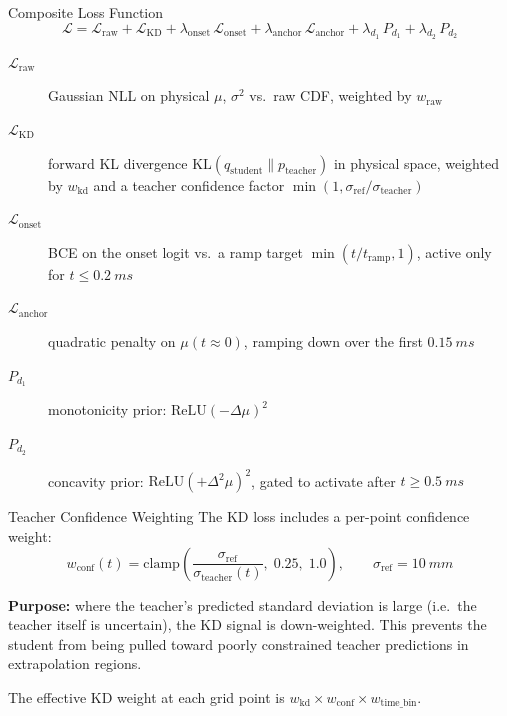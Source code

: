 \documentclass[UTF8,aspectratio=169]{ctexbeamer}
\begin{document}
\begin{frame}{Composite Loss Function}
\[
\mathcal{L} = \mathcal{L}_{\mathrm{raw}} + \mathcal{L}_{\mathrm{KD}} + \lambda_{\mathrm{onset}}\,\mathcal{L}_{\mathrm{onset}} + \lambda_{\mathrm{anchor}}\,\mathcal{L}_{\mathrm{anchor}} + \lambda_{d_1}\,P_{d_1} + \lambda_{d_2}\,P_{d_2}
\]

\vspace{0.2em}
\begin{description}
  \item[$\mathcal{L}_{\mathrm{raw}}$] Gaussian NLL on physical $\mu$, $\sigma^2$ vs.\ raw CDF, weighted by $w_{\mathrm{raw}}$
  \item[$\mathcal{L}_{\mathrm{KD}}$] forward KL divergence $\mathrm{KL}(q_{\mathrm{student}}\|p_{\mathrm{teacher}})$ in physical space, weighted by $w_{\mathrm{kd}}$ and a teacher confidence factor $\min(1, \sigma_{\mathrm{ref}}/\sigma_{\mathrm{teacher}})$
  \item[$\mathcal{L}_{\mathrm{onset}}$] BCE on the onset logit vs.\ a ramp target $\min(t/t_{\mathrm{ramp}}, 1)$, active only for $t\leq\SI{0.2}{ms}$
  \item[$\mathcal{L}_{\mathrm{anchor}}$] quadratic penalty on $\mu(t\approx0)$, ramping down over the first $\SI{0.15}{ms}$
  \item[$P_{d_1}$] monotonicity prior: $\mathrm{ReLU}(-\Delta\mu)^2$
  \item[$P_{d_2}$] concavity prior: $\mathrm{ReLU}(+\Delta^2\mu)^2$, gated to activate after $t\geq\SI{0.5}{ms}$
\end{description}
\end{frame}

\begin{frame}{Teacher Confidence Weighting}
The KD loss includes a per-point confidence weight:
\[
w_{\mathrm{conf}}(t) = \mathrm{clamp}\!\left(\frac{\sigma_{\mathrm{ref}}}{\sigma_{\mathrm{teacher}}(t)},\;0.25,\;1.0\right), \qquad \sigma_{\mathrm{ref}} = \SI{10}{mm}
\]

\textbf{Purpose:} where the teacher's predicted standard deviation is large (i.e.\ the teacher itself is uncertain), the KD signal is down-weighted. This prevents the student from being pulled toward poorly constrained teacher predictions in extrapolation regions.

\vspace{0.3em}
The effective KD weight at each grid point is $w_{\mathrm{kd}} \times w_{\mathrm{conf}} \times w_{\mathrm{time\_bin}}$.
\end{frame}
\end{document}
